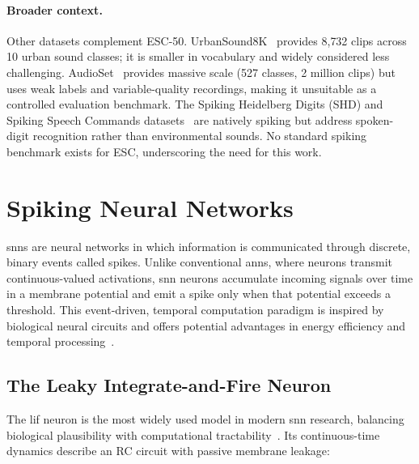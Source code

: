 \paragraph{Broader context.}
Other datasets complement ESC-50. UrbanSound8K~\citep{salamon2014} provides 8{,}732 clips across 10 urban sound classes; it is smaller in vocabulary and widely considered less challenging. AudioSet~\citep{gemmeke2017} provides massive scale (527 classes, 2 million clips) but uses weak labels and variable-quality recordings, making it unsuitable as a controlled evaluation benchmark. The Spiking Heidelberg Digits (SHD) and Spiking Speech Commands datasets~\citep{cramer2020} are natively spiking but address spoken-digit recognition rather than environmental sounds. No standard spiking benchmark exists for ESC, underscoring the need for this work.


\section{Spiking Neural Networks}
\label{sec:snn-background}

\Glspl{snn} are neural networks in which information is communicated through discrete, binary events called spikes. Unlike conventional \glspl{ann}, where neurons transmit continuous-valued activations, \gls{snn} neurons accumulate incoming signals over time in a membrane potential and emit a spike only when that potential exceeds a threshold. This event-driven, temporal computation paradigm is inspired by biological neural circuits and offers potential advantages in energy efficiency and temporal processing~\citep{maass1997,gerstner2002}.

\subsection{The Leaky Integrate-and-Fire Neuron}
\label{subsec:lif}

The \gls{lif} neuron is the most widely used model in modern \gls{snn} research, balancing biological plausibility with computational tractability~\citep{gerstner2002}. Its continuous-time dynamics describe an RC circuit with passive membrane leakage:

